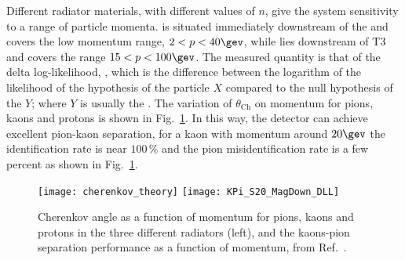Different radiator materials, with different values of $n$, give the \rich system sensitivity to a
range of particle momenta.
\richone is situated immediately downstream of the \velo and covers the low momentum range,
$2<p<40\gev$, while \richtwo lies downstream of T3 and covers the range $15<p<100\gev$.
The measured quantity is that of the delta log-likelihood, \dllxy, which is the difference between the
logarithm of the likelihood of the hypothesis of the particle $X$ compared to the null hypothesis of the
$Y$; where $Y$ is usually the \pion.
The variation of $\theta_\mathrm{Ch}$ on momentum for pions, kaons and protons is shown in
Fig.~\ref{fig:lhcb:pideff}.
In this way, the \lhcb detector can achieve excellent pion-kaon separation, for a kaon with
momentum around $20\gev$ the identification rate is near $100\,\%$ and the pion misidentification
rate is a few percent as shown in Fig.~\ref{fig:lhcb:pideff}.

\begin{figure}
  \begin{center}
    \texttt{[image: cherenkov\_theory]}
    \texttt{[image: KPi\_S20\_MagDown\_DLL]}
  \end{center}
  \caption[Particle identification and Cherenkov angles]
  {\small
    Cherenkov angle as a function of momentum for pions, kaons and protons in the three different
    radiators (left), and the kaons-pion separation performance as a function of momentum, from
    Ref.~\cite{LHCb-DP-2012-003}.
  }
  \label{fig:lhcb:pideff}
\end{figure}





